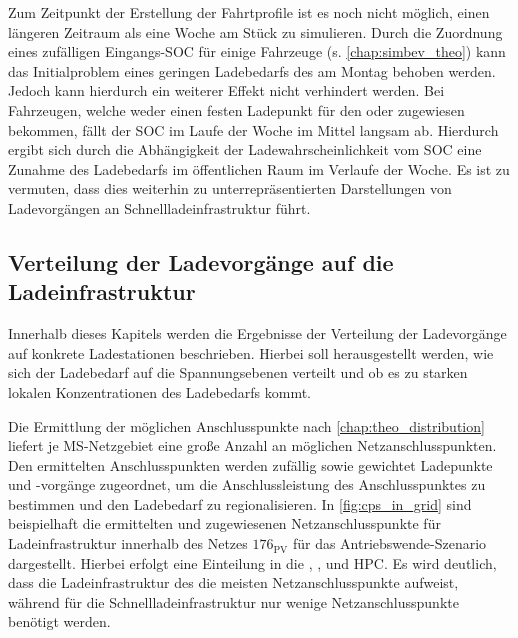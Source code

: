 

Zum Zeitpunkt der Erstellung der Fahrtprofile ist es noch nicht möglich, einen längeren Zeitraum als eine Woche am Stück zu simulieren.
Durch die Zuordnung eines zufälligen Eingangs-\gls{SOC} für einige Fahrzeuge (s. \autoref{chap:simbev_theo}) kann das Initialproblem eines geringen Ladebedarfs des \UC \Firmeparkplatz am Montag behoben werden.
Jedoch kann hierdurch ein weiterer Effekt nicht verhindert werden.
Bei Fahrzeugen, welche weder einen festen Ladepunkt für den \UC \zH oder \Firmeparkplatz zugewiesen bekommen, fällt der \gls{SOC} im Laufe der Woche im Mittel langsam ab.
Hierdurch ergibt sich durch die Abhängigkeit der Ladewahrscheinlichkeit vom \gls{SOC} eine Zunahme des Ladebedarfs im öffentlichen Raum im Verlaufe der Woche.
Es ist zu vermuten, dass dies weiterhin zu un­ter­re­prä­sen­tierten Darstellungen von Ladevorgängen an Schnellladeinfrastruktur führt.


\subsection{Verteilung der Ladevorgänge auf die Ladeinfrastruktur}\label{chap:distribute_demand_ev}

Innerhalb dieses Kapitels werden die Ergebnisse der Verteilung der Ladevorgänge auf konkrete Ladestationen beschrieben.
Hierbei soll herausgestellt werden, wie sich der Ladebedarf auf die Spannungsebenen verteilt und ob es zu starken lokalen Konzentrationen des Ladebedarfs kommt.\medskip

Die Ermittlung der möglichen Anschlusspunkte nach \autoref{chap:theo_distribution} liefert je \gls{MS}-Netzgebiet eine große Anzahl an möglichen Netzanschlusspunkten.
Den ermittelten Anschlusspunkten werden zufällig sowie gewichtet Ladepunkte und -vorgänge zugeordnet, um die Anschlussleistung des Anschlusspunktes zu bestimmen und den Ladebedarf zu regionalisieren.
In \autoref{fig:cps_in_grid} sind beispielhaft die ermittelten und zugewiesenen Netzanschlusspunkte für Ladeinfrastruktur innerhalb des Netzes \(176_{\text{PV}}\) für das Antriebswende-Szenario dargestellt.
Hierbei erfolgt eine Einteilung in die \UCs \zHdot, \Firmeparkplatzdot, \oeffen und \gls{HPC}.
Es wird deutlich, dass die Ladeinfrastruktur des \UC \zH die meisten Netzanschlusspunkte aufweist, während für die Schnellladeinfrastruktur nur wenige Netzanschlusspunkte benötigt werden.



